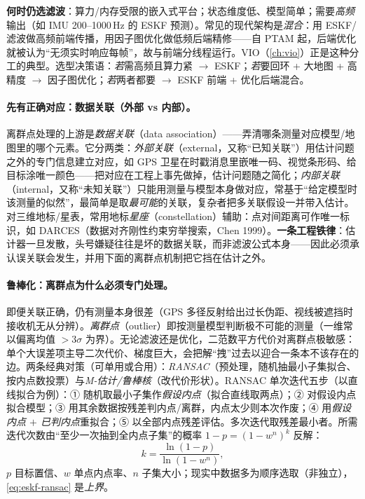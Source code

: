 \begin{insight}
\textbf{何时仍选滤波}：算力/内存受限的嵌入式平台；状态维度低、模型简单；需要\emph{高频}输出（如 IMU 200--1000\,Hz 的 ESKF 预测）。常见的现代架构是\emph{混合}：用 ESKF/滤波做高频前端传播，用因子图优化做低频后端精修——自 PTAM 起，后端优化就被认为“无须实时响应每帧”，故与前端分线程运行\cite{gaoxiang2019slam14}。VIO（\cref{ch:vio}）正是这种分工的典型。选型决策语：\emph{若}需高频且算力紧 $\to$ ESKF；\emph{若}要回环 + 大地图 + 高精度 $\to$ 因子图优化；\emph{若}两者都要 $\to$ ESKF 前端 + 优化后端混合。
\end{insight}

\paragraph{先有正确对应：数据关联（外部 vs 内部）。}
离群点处理的上游是\emph{数据关联}（data association）——弄清哪条测量对应模型/地图里的哪个元素\cite{barfoot2024state}。它分两类：\emph{外部关联}（external，又称“已知关联”）用估计问题之外的专门信息建立对应，如 GPS 卫星在时戳消息里嵌唯一码、视觉条形码、给目标涂唯一颜色——把对应在工程上事先做掉，估计问题随之简化；\emph{内部关联}（internal，又称“未知关联”）只能用测量与模型本身做对应，常基于“给定模型时该测量的似然”，最简单是取\emph{最可能}的关联，复杂者把多关联假设一并带入估计。对三维地标/星表，常用地标\emph{星座}（constellation）辅助：点对间距离可作唯一标识，如 DARCES（数据对齐刚性约束穷举搜索，Chen 1999\cite{chen1999ransac}）。\textbf{一条工程铁律}：估计器一旦发散，头号嫌疑往往是坏的数据关联，而非滤波公式本身——因此必须承认误关联会发生，并用下面的离群点机制把它挡在估计之外。

\paragraph{鲁棒化：离群点为什么必须专门处理。}
即便关联正确，仍有测量本身很差（GPS 多径反射给出过长伪距、视线被遮挡时接收机无从分辨）。\emph{离群点}（outlier）即按测量模型判断极不可能的测量（一维常以偏离均值 $>3\sigma$ 为界）。无论滤波还是优化，二范数平方代价对离群点极敏感：单个大误差项主导二次代价、梯度巨大，会把解“拽”过去以迎合一条本不该存在的边\cite{gaoxiang2019slam14}。两条经典对策（可单用或合用）\cite{barfoot2024state}：\emph{RANSAC}（预处理，随机抽最小子集拟合、按内点数投票）与\emph{M-估计/鲁棒核}（改代价形状）。RANSAC 单次迭代五步（以直线拟合为例）：① 随机取最小子集作\emph{假设内点}（拟合直线取两点）；② 对假设内点拟合模型；③ 用其余数据按残差判内点/离群，内点太少则本次作废；④ 用\emph{假设内点 $+$ 已判内点}重拟合；⑤ 以全部内点残差评估。多次迭代取残差最小者。所需迭代次数由“至少一次抽到全内点子集”的概率 $1-p=(1-w^n)^k$ 反解：
\begin{equation}
  k=\frac{\ln(1-p)}{\ln(1-w^n)},
  \label{eq:eskf-ransac}
\end{equation}
$p$ 目标置信、$w$ 单点内点率、$n$ 子集大小；现实中数据多为顺序选取（非独立），\cref{eq:eskf-ransac} 是\emph{上界}。

